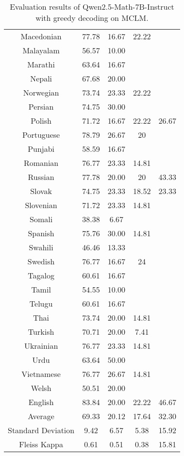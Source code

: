 \begin{table*}[]
\begin{tabular}{c|cccc}
Macedonian & 77.78 & 16.67 & 22.22 &  \\
Malayalam & 56.57 & 10.00 & \multicolumn{1}{l}{} &  \\
Marathi & 63.64 & 16.67 & \multicolumn{1}{l}{} &  \\
Nepali & 67.68 & 20.00 & \multicolumn{1}{l}{} &  \\
Norwegian & 73.74 & 23.33 & 22.22 &  \\
Persian & 74.75 & 30.00 & \multicolumn{1}{l}{} &  \\
Polish & 71.72 & 16.67 & 22.22 & 26.67 \\
Portuguese & 78.79 & 26.67 & 20 &  \\
Punjabi & 58.59 & 16.67 & \multicolumn{1}{l}{} &  \\
Romanian & 76.77 & 23.33 & 14.81 &  \\
Russian & 77.78 & 20.00 & 20 & 43.33 \\
Slovak & 74.75 & 23.33 & 18.52 & 23.33 \\
Slovenian & 71.72 & 23.33 & 14.81 &  \\
Somali & 38.38 & 6.67 & \multicolumn{1}{l}{} &  \\
Spanish & 75.76 & 30.00 & 14.81 &  \\
Swahili & 46.46 & 13.33 & \multicolumn{1}{l}{} &  \\
Swedish & 76.77 & 16.67 & 24 &  \\
Tagalog & 60.61 & 16.67 & \multicolumn{1}{l}{} &  \\
Tamil & 54.55 & 10.00 & \multicolumn{1}{l}{} &  \\
Telugu & 60.61 & 16.67 & \multicolumn{1}{l}{} &  \\
Thai & 73.74 & 20.00 & 14.81 &  \\
Turkish & 70.71 & 20.00 & 7.41 &  \\
Ukrainian & 76.77 & 23.33 & 14.81 &  \\
Urdu & 63.64 & 50.00 & \multicolumn{1}{l}{} &  \\
Vietnamese & 76.77 & 26.67 & 14.81 &  \\
Welsh & 50.51 & 20.00 & \multicolumn{1}{l}{} &  \\
\rowcolor[HTML]{FCE5CD} 
English & 83.84 & 20.00 & 22.22 & 46.67 \\ \midrule
Average & 69.33 & 20.12 & 17.64 & 32.30 \\
Standard Deviation & 9.42 & 6.57 & 5.38 & 15.92 \\
Fleiss Kappa & 0.61 & 0.51 & 0.38 & 15.81 \\ \bottomrule
\end{tabular}
\caption{\footnotesize Evaluation results of Qwen2.5-Math-7B-Instruct with greedy decoding on MCLM.}
\label{tab:7B_greedy}
\end{table*}

